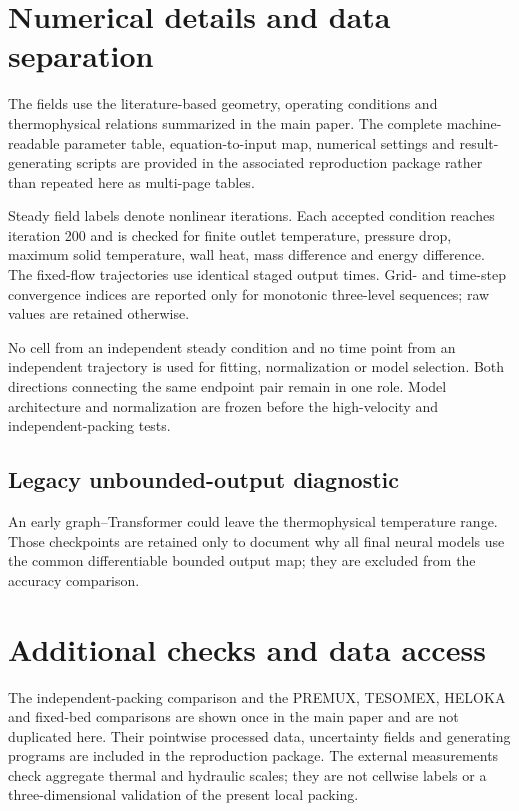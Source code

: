 \section{Numerical details and data separation}

The \OpenFOAM{} fields use the literature-based geometry, operating conditions
and thermophysical relations summarized in the main paper. The complete
machine-readable parameter table, equation-to-input map, numerical settings
and result-generating scripts are provided in the associated reproduction package
rather than repeated here as multi-page tables.

Steady field labels denote nonlinear iterations. Each accepted condition
reaches iteration 200 and is checked for finite outlet temperature, pressure
drop, maximum solid temperature, wall heat, mass difference and energy
difference. The fixed-flow trajectories use identical staged output times.
Grid- and time-step convergence indices are reported only for monotonic
three-level sequences; raw values are retained otherwise.



No cell from an independent steady condition and no time point from an
independent trajectory is used for fitting, normalization or model selection.
Both directions connecting the same endpoint pair remain in one role. Model
architecture and normalization are frozen before the high-velocity and
independent-packing tests.

\subsection{Legacy unbounded-output diagnostic}

An early graph--Transformer could leave the thermophysical temperature range.
Those checkpoints are retained only to document why all final neural models
use the common differentiable bounded output map; they are excluded from the
accuracy comparison.


\section{Additional checks and data access}

The independent-packing comparison and the PREMUX, TESOMEX, HELOKA and
fixed-bed comparisons are shown once in the main paper and are not duplicated
here. Their pointwise processed data, uncertainty fields and generating
programs are included in the reproduction package. The external measurements
check aggregate thermal and hydraulic scales; they are not cellwise labels or
a three-dimensional validation of the present local packing.

